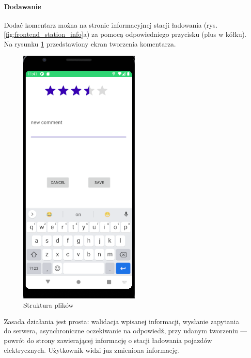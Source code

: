 \paragraph{Dodawanie\newline}
Dodać komentarz można na stronie informacyjnej stacji ładowania (rys. \ref{fig:frontend_station_info}a) za pomocą odpowiedniego przycisku (plus w kółku). Na rysunku \ref{fig:front_comment_create} przedstawiony ekran tworzenia komentarza.
\begin{figure}[ht]
    \centering
    \includegraphics[width=0.25\linewidth]{rys03/front_comment_create.png}
    \caption{Struktura plików}
    \label{fig:front_comment_create}
\end{figure}
Zasada działania jest prosta: walidacja wpisanej informacji, wysłanie zapytania do serwera, asynchroniczne oczekiwanie na odpowiedź, przy udanym tworzeniu — powrót do strony zawierającej informację o stacji ładowania pojazdów elektrycznych.
Użytkownik widzi juz zmieniona informację.